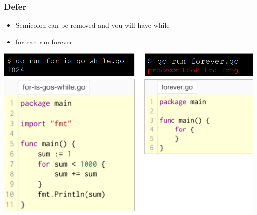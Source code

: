 \documentclass[14pt]{beamer}
\begin{document}
{
\begin{frame}
    \frametitle{Defer}
    \begin{itemize}
        \item Semicolon can be removed and you will have while
        \item for can run forever
    \end{itemize}
    \begin{center}
        \includegraphics[width=0.8\linewidth]{img/while.PNG}
    \end{center}
\end{frame}
}
\end{document}
